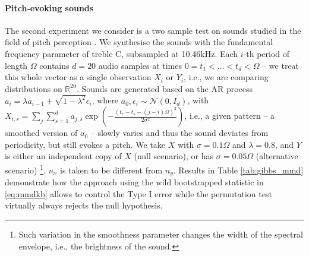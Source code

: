\paragraph{Pitch-evoking sounds}
The second experiment we consider is a two sample test on sounds studied in the field of pitch perception \cite{hehrmannthesis}. We synthesise the sounds with the fundamental frequency
parameter of treble C, subsampled at 10.46kHz. Each $i$-th period
of length $\Omega$ contains $d=20$ audio samples at times $0=t_{1}<\ldots<t_{d}<\Omega$
-- we treat this whole vector as a single observation $X_{i}$ or
$Y_{i}$, i.e., we are comparing distributions on $\mathbb{R}^{20}$.
Sounds are generated based on the AR process $a_{i}=\lambda a_{i-1}+\sqrt{1-\lambda^{2}}\epsilon_{i}$,
where $a_{0},\epsilon_{i}\sim\mathcal{N}(0,I_{d})$, with $X_{i,r}=\sum_{j}\sum_{s=1}^{d}a_{j,s}\exp\left(-\frac{\left(t_{r}-t_{s}-(j-i)\Omega\right)^{2}}{2\sigma^{2}}\right)$,
i.e., a given pattern -- a smoothed version of $a_{0}$ -- slowly
varies and thus the sound deviates from
periodicity, but still evokes a pitch. We take
$X$ with $\sigma=0.1\Omega$
and $\lambda=0.8$, and $Y$ is either an independent copy of $X$
(null scenario), or has $\sigma=0.05\Omega$ (alternative scenario)%
\footnote{Such variation in the smoothness parameter changes the width of the
spectral envelope, i.e., the brightness of the sound.}. $n_x$ is taken to be different from $n_y$. Results in Table \ref{tab:gibbs_mmd} demonstrate how the
approach using the wild bootstrapped statistic in \eqref{eq:mmdkb} allows to control the Type I error while the permutation test
virtually always rejects the null hypothesis.

% 


